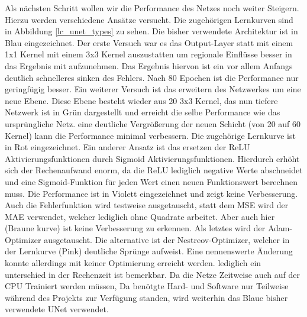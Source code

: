 Als nächsten Schritt wollen wir die Performance des Netzes noch weiter Steigern. Hierzu werden verschiedene Ansätze versucht. Die zugehörigen Lernkurven sind in Abbildung \ref{lc_unet_types} zu sehen.
Die bisher verwendete Architektur ist in Blau eingezeichnet. Der erste Versuch war es das Output-Layer statt mit einem 1x1 Kernel mit einem 3x3 Kernel auszustatten um regionale Einflüsse besser in das Ergebnis mit aufzunehmen. Das Ergebnis hiervon ist ein vor allem Anfangs deutlich schnelleres sinken des Fehlers. Nach 80 Epochen ist die Performance nur geringfügig besser. Ein weiterer Versuch ist das erweitern des Netzwerkes um eine neue Ebene. Diese Ebene besteht wieder aus 20 3x3 Kernel, das nun tiefere Netzwerk ist in Grün dargestellt und erreicht die selbe Performance wie das ursprüngliche Netz. eine deutliche Vergrößerung der neuen Schicht (von 20 auf 60 Kernel) kann die Performance minimal verbessern. Die zugehörige Lernkurve ist in Rot eingezeichnet. Ein anderer Ansatz ist das ersetzen der ReLU Aktivierungsfunktionen durch Sigmoid Aktivierungsfunktionen. Hierdurch erhöht sich der Rechenaufwand enorm, da die ReLU lediglich negative Werte abschneidet und eine Sigmoid-Funktion für jeden Wert einen neuen Funktionswert berechnen muss. Die Performance ist in Violett eingezeichnet und zeigt keine Verbesserung. Auch die Fehlerfunktion wird testweise ausgetauscht, statt dem MSE wird der MAE verwendet, welcher lediglich ohne Quadrate arbeitet. Aber auch hier (Braune kurve) ist keine Verbesserung zu erkennen. Als letztes wird der Adam-Optimizer ausgetauscht. Die alternative ist der Nestreov-Optimizer, welcher in der Lernkurve (Pink) deutliche Sprünge aufweist. Eine nennenswerte Änderung konnte allerdings mit keiner Optimierung erreicht werden. lediglich ein unterschied in der Rechenzeit ist bemerkbar. Da die Netze Zeitweise auch auf der CPU Trainiert werden müssen, Da benötgte Hard- und Software nur Teilweise während des Projekts zur Verfügung standen, wird weiterhin das Blaue bisher verwendete UNet verwendet.

